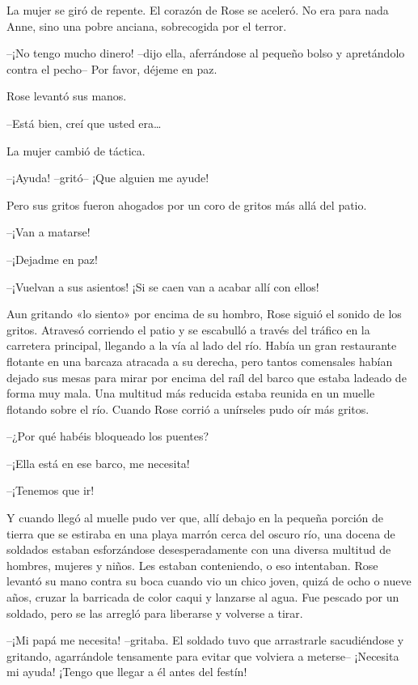 {La mujer se giró de repente. El corazón de Rose se aceleró. No era para
nada Anne, sino una pobre anciana, sobrecogida por el terror.}

{--¡No tengo mucho dinero! --dijo ella, aferrándose al pequeño bolso y
apretándolo contra el pecho-- Por favor, déjeme en paz.}

{Rose levantó sus manos.}

{--Está bien, creí que usted era\ldots{}}

{La mujer cambió de táctica.}

{--¡Ayuda! --gritó-- ¡Que alguien me ayude!}

{Pero sus gritos fueron ahogados por un coro de gritos más allá del
patio.}

{--¡Van a matarse!}

{--¡Dejadme en paz!}

{--¡Vuelvan a sus asientos! ¡Si se caen van a acabar allí con ellos!}

{Aun gritando «lo siento» por encima de su hombro, Rose siguió el sonido
 de los gritos. Atravesó corriendo el patio y se escabulló a través del
 tráfico en la carretera principal, llegando a la vía al lado del río.
 Había un gran restaurante flotante en una barcaza atracada a su derecha,
 pero tantos comensales habían dejado sus mesas para mirar por encima del
 raíl del barco que estaba ladeado de forma muy mala. Una multitud más
 reducida estaba reunida en un muelle flotando sobre el río. Cuando Rose
corrió a unírseles pudo oír más gritos.}

{--¿Por qué habéis bloqueado los puentes?}

{--¡Ella está en ese barco, me necesita!}

{--¡Tenemos que ir!}

{Y cuando llegó al muelle pudo ver que, allí debajo en la pequeña
 porción de tierra que se estiraba en una playa marrón cerca del oscuro
 río, una docena de soldados estaban esforzándose desesperadamente con
 una diversa multitud de hombres, mujeres y niños. Les estaban
 conteniendo, o eso intentaban. Rose levantó su mano contra su boca
 cuando vio un chico joven, quizá de ocho o nueve años, cruzar la
 barricada de color caqui y lanzarse al agua. Fue pescado por un soldado,
pero se las arregló para liberarse y volverse a tirar.}

{--¡Mi papá me necesita! --gritaba. El soldado tuvo que arrastrarle
 sacudiéndose y gritando, agarrándole tensamente para evitar que volviera
 a meterse-- ¡Necesita mi ayuda! ¡Tengo que llegar a él antes del
festín!}

